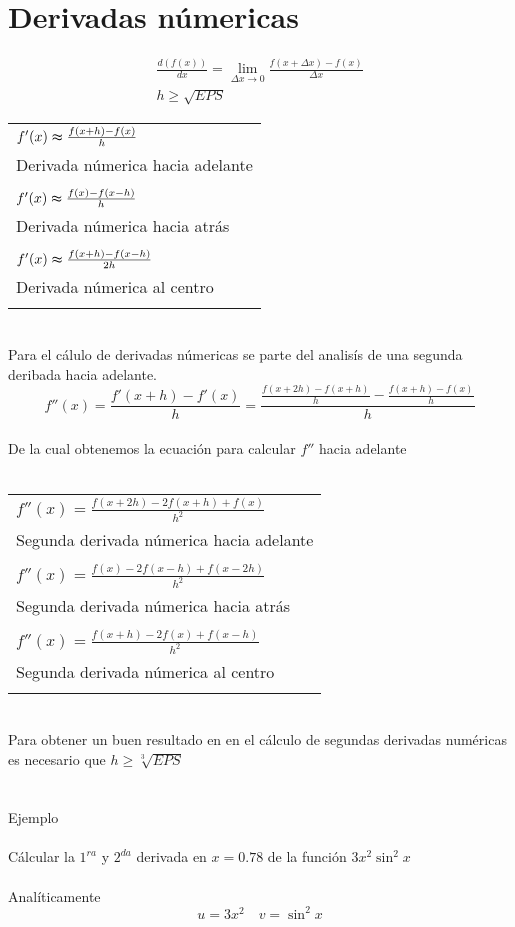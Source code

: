 \chapter{Derivadas n\'umericas}
\begin{eqnarray}
\nonumber
\frac{d(f(x))}{dx}=\lim\limits_{\Delta x\to0}\frac{f(x+\Delta x)-f(x)}{\Delta x} \\ 
\nonumber h\geq\sqrt{EPS}
\end{eqnarray}
\begin{tabular}{ l }
$f'(x)\thickapprox \frac{f(x+h)-f(x)}{h}$ \\
 Derivada n\'umerica hacia adelante \\
\\
$f'(x)\thickapprox \frac{f(x)-f(x-h)}{h}$ \\
 Derivada n\'umerica hacia atr\'as \\
\\
$f'(x)\thickapprox \frac{f(x+h)-f(x-h)}{2h}$ \\
 Derivada n\'umerica al centro \\
\\
\end{tabular}
\\
Para el c\'alulo de derivadas n\'umericas se parte del analis\'is de una segunda deribada hacia adelante.\\
\begin{displaymath}
f''(x)=\frac{f'(x+h)-f'(x)}{h}=\frac{\frac{f(x+2h)-f(x+h)}{h}-\frac{f(x+h)-f(x)}{h}}{h}
\end{displaymath} 
\\De la cual obtenemos la ecuaci\'on para calcular $f''$ hacia adelante\\ \\
\begin{tabular}{  l  }
$f''(x)=\frac{f(x+2h)-2f(x+h)+f(x)}{h^2}$ \\
Segunda derivada n\'umerica hacia adelante \\
\\
$f''(x)=\frac{f(x)-2f(x-h)+f(x-2h)}{h^2}$ \\
Segunda derivada n\'umerica hacia atr\'as \\
\\
$f''(x)=\frac{f(x+h)-2f(x)+f(x-h)}{h^2}$ \\
Segunda derivada n\'umerica al centro \\
\\
\end{tabular}
\\
Para obtener un buen resultado en en el c\'alculo de segundas derivadas num\'ericas es necesario que $h\geq\sqrt[3]{EPS}$ \\ \\ \\
Ejemplo\\ \\
C\'alcular la $1^{ra}$ y $2^{da}$ derivada en $x=0.78$ de la funci\'on $3x^2\sin^2x$\\ \\
Anal\'iticamente \\
\begin{displaymath}
u=3x^2\quad v=\sin^2x
\end{displaymath}
